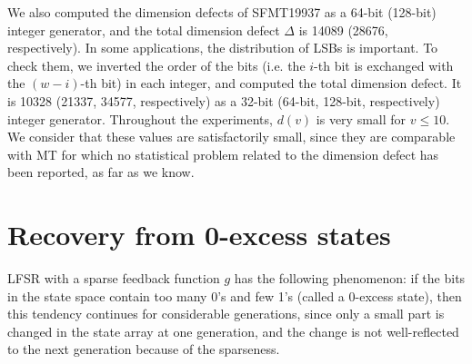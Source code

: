 \documentclass[acmnow]{acmtrans2m}
\begin{document}
We also computed the dimension defects of SFMT19937 as a 64-bit
(128-bit) integer generator, and the total dimension 
defect $\Delta$ is 14089 (28676, respectively). In some applications, 
the distribution of LSBs is important. 
To check them, we inverted the order of the bits (i.e. the $i$-th
bit is exchanged with the $(w-i)$-th bit) in each integer, 
and computed the total dimension defect. It is
10328 (21337, 34577, respectively) as
a 32-bit (64-bit, 128-bit, respectively) integer generator.
Throughout the experiments, $d(v)$ is very small for $v\leq 10$.
We consider that these values are satisfactorily small, since
they are comparable with MT
for which no statistical problem 
related to the dimension defect has been reported, 
as far as we know.

\section{Recovery from 0-excess states}
LFSR with a sparse feedback function $g$ has
the following phenomenon: 
if the bits in the state space 
contain too many 0's and few 1's (called a 0-excess state), then
this tendency continues for considerable generations,
since only a small part is changed in the state array
at one generation, and the change is not well-reflected to 
the next generation because of the sparseness.
\end{document}
